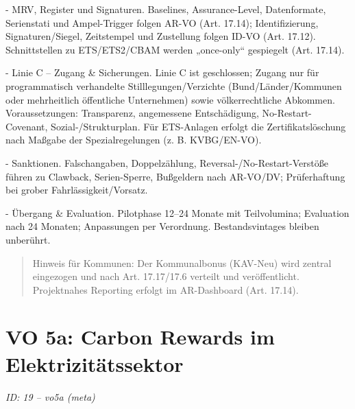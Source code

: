 \documentclass[12pt,a4paper]{scrartcl}
\begin{document}
- MRV, Register und Signaturen. Baselines, Assurance-Level, Datenformate, Serienstati und Ampel-Trigger folgen AR-VO (Art. 17.14); Identifizierung, Signaturen/Siegel, Zeitstempel und Zustellung folgen ID-VO (Art. 17.12). Schnittstellen zu ETS/ETS2/CBAM werden „once-only“ gespiegelt (Art. 17.14).

- Linie C -- Zugang \& Sicherungen. Linie C ist geschlossen; Zugang nur für programmatisch verhandelte Stilllegungen/Verzichte (Bund/Länder/Kommunen oder mehrheitlich öffentliche Unternehmen) sowie völkerrechtliche Abkommen. Voraussetzungen: Transparenz, angemessene Entschädigung, No-Restart-Covenant, Sozial-/Strukturplan. Für ETS-Anlagen erfolgt die Zertifikatslöschung nach Maßgabe der Spezialregelungen (z. B. KVBG/EN-VO).

- Sanktionen. Falschangaben, Doppelzählung, Reversal-/No-Restart-Verstöße führen zu Clawback, Serien-Sperre, Bußgeldern nach AR-VO/DV; Prüferhaftung bei grober Fahrlässigkeit/Vorsatz.

- Übergang \& Evaluation. Pilotphase 12--24 Monate mit Teilvolumina; Evaluation nach 24 Monaten; Anpassungen per Verordnung. Bestandsvintages bleiben unberührt.

{\footnotesize\begin{quote}
Hinweis für Kommunen: Der Kommunalbonus (KAV-Neu) wird zentral eingezogen und nach Art. 17.17/17.6 verteilt und veröffentlicht. Projektnahes Reporting erfolgt im AR-Dashboard (Art. 17.14).
\end{quote}}



\section[VO 5a: Carbon Rewards im Elektrizitätssektor]{VO 5a: Carbon Rewards im Elektrizitätssektor}
\noindent\textit{ID: 19 -- vo5a (meta)}
\end{document}
